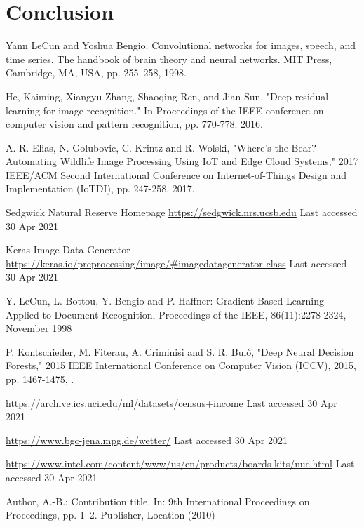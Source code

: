 \documentclass[runningheads]{llncs}
\begin{document}
\section{Conclusion}
\label{spt:conclusion}



%
%
%


% 

\begin{thebibliography}{8}

Yann LeCun and Yoshua Bengio. Convolutional networks for images, speech, and time series. The handbook of brain theory and neural networks. MIT Press, Cambridge, MA, USA, pp. 255–258, 1998.

He, Kaiming, Xiangyu Zhang, Shaoqing Ren, and Jian Sun. "Deep residual learning for image recognition." In Proceedings of the IEEE conference on computer vision and pattern recognition, pp. 770-778. 2016.

A. R. Elias, N. Golubovic, C. Krintz and R. Wolski, "Where's the Bear? - Automating Wildlife Image Processing Using IoT and Edge Cloud Systems," 2017 IEEE/ACM Second International Conference on Internet-of-Things Design and Implementation (IoTDI), pp. 247-258, 2017.

Sedgwick Natural Reserve Homepage \url{https://sedgwick.nrs.ucsb.edu} Last accessed 30 Apr 2021


Keras Image Data Generator \url{https://keras.io/preprocessing/image/\#imagedatagenerator-class} Last accessed 30 Apr 2021


Y. LeCun, L. Bottou, Y. Bengio and P. Haffner: Gradient-Based Learning Applied to Document Recognition, Proceedings of the IEEE, 86(11):2278-2324, November 1998

P. Kontschieder, M. Fiterau, A. Criminisi and S. R. Bulò, "Deep Neural Decision Forests," 2015 IEEE International Conference on Computer Vision (ICCV), 2015, pp. 1467-1475, .

\url{https://archive.ics.uci.edu/ml/datasets/census+income} Last accessed 30 Apr 2021

\url{https://www.bgc-jena.mpg.de/wetter/} Last accessed 30 Apr 2021 

\url{https://www.intel.com/content/www/us/en/products/boards-kits/nuc.html} Last accessed 30 Apr 2021 


Author, A.-B.: Contribution title. In: 9th International Proceedings
on Proceedings, pp. 1--2. Publisher, Location (2010)

\end{thebibliography}
\end{document}
